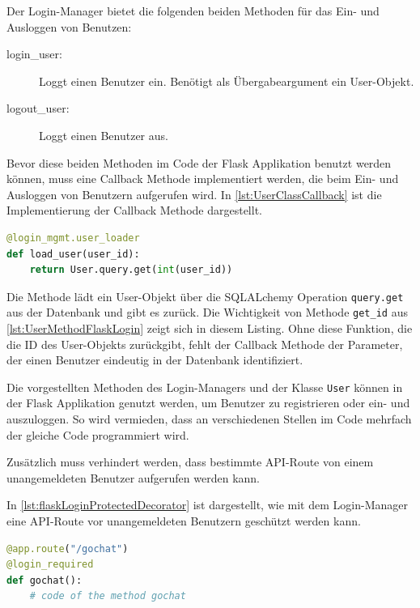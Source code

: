 \documentclass[a4paper,titlepage,halfparskip,12pt]{scrreprt}
\begin{document}
\begin{onehalfspacing}
Der Login-Manager bietet die folgenden beiden Methoden für das Ein- und Ausloggen von Benutzen:

\begin{description}
\item[login\_user:] Loggt einen Benutzer ein. Benötigt als Übergabeargument ein User-Objekt.
\item[logout\_user:] Loggt einen Benutzer aus.
\end{description}

Bevor diese beiden Methoden im Code der Flask Applikation benutzt werden können, muss eine Callback Methode implementiert werden, die beim Ein- und Ausloggen von Benutzern aufgerufen wird. In \autoref{lst:UserClassCallback} ist die Implementierung der Callback Methode dargestellt.

\begin{lstlisting}[language=python, caption={Callback Methode für das Modul flask\_login}, label={lst:UserClassCallback}]
@login_mgmt.user_loader
def load_user(user_id):
    return User.query.get(int(user_id))
\end{lstlisting}

Die Methode lädt ein User-Objekt über die SQLALchemy Operation \texttt{query.get} aus der Datenbank und gibt es zurück. Die Wichtigkeit von Methode \texttt{get\_id} aus \autoref{lst:UserMethodFlaskLogin} zeigt sich in diesem Listing. Ohne diese Funktion, die die ID des User-Objekts zurückgibt, fehlt der Callback Methode der Parameter, der einen Benutzer eindeutig in der Datenbank identifiziert.\cite{flaskLogin}

Die vorgestellten Methoden des Login-Managers und der Klasse \texttt{User} können in der Flask Applikation genutzt werden, um Benutzer zu registrieren oder ein- und auszuloggen. So wird vermieden, dass an verschiedenen Stellen im Code mehrfach der gleiche Code programmiert wird.

Zusätzlich muss verhindert werden, dass bestimmte \acs{API}-Route von einem unangemeldeten Benutzer aufgerufen werden kann.

In \autoref{lst:flaskLoginProtectedDecorator} ist dargestellt, wie mit dem Login-Manager eine \acs{API}-Route vor unangemeldeten Benutzern geschützt werden kann.

\begin{lstlisting}[language=python, caption={Code für den Schutz der \acs{API}-Route vor unangemeldeten Benutzern}, label={lst:flaskLoginProtectedDecorator}]
@app.route("/gochat")
@login_required
def gochat():
    # code of the method gochat
\end{lstlisting}


\end{onehalfspacing}
\end{document}

